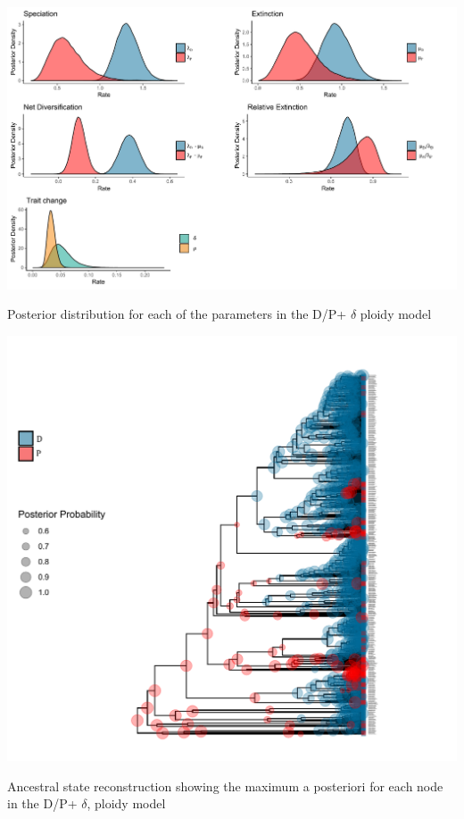 \begin{suppfigure}
\includegraphics[width=\textwidth]{bisseDPposteriordist.pdf}
\caption{Posterior distribution for each of the parameters in the D/P+ $\delta$ ploidy model} %
\label{suppfigure:DP}
\end{suppfigure}

\begin{suppfigure}
\includegraphics[width=\textwidth]{asrDPdelta.pdf}
\caption{Ancestral state reconstruction showing the maximum a posteriori for each node in the D/P+ $\delta$, ploidy model} %
\label{suppfigure:DPasr}
\end{suppfigure}

